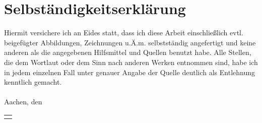 \section*{Selbst\"andigkeitserkl\"arung}

Hiermit versichere ich an Eides statt, dass ich diese Arbeit einschlie\ss lich evtl. beigef\"ugter Abbildungen, Zeichnungen u.\"A.m. selbstst\"andig angefertigt und keine anderen als die angegebenen Hilfsmittel und Quellen benutzt habe. Alle Stellen, die dem Wortlaut oder dem Sinn nach anderen Werken entnommen sind, habe ich in jedem einzelnen Fall unter genauer Angabe der Quelle deutlich als Entlehnung kenntlich gemacht.\\
%
\vspace{1cm}
\\
{Aachen, den \handindate}\hfill
\begin{tabular}{c}
	\\\\\hline
	\hspace*{24mm}\author\hspace*{24mm}
\end{tabular}

